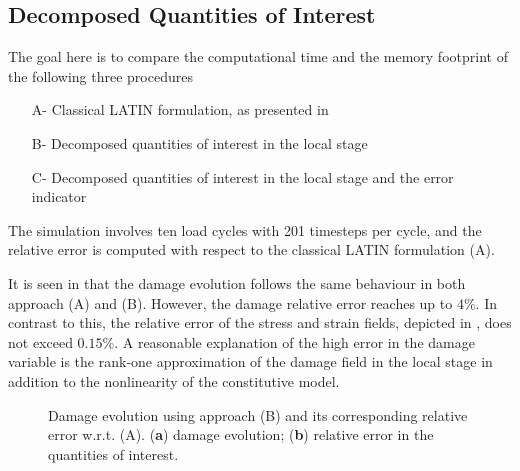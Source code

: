 \subsection{Decomposed Quantities of Interest}
\label{sec7_example_pgd}
The goal here is to compare the computational time and the memory footprint of the following three procedures
\begin{enumerate}
	\item[A-] Classical LATIN formulation, as presented in 
	\item[B-] Decomposed quantities of interest in the local stage
	\item[C-] Decomposed quantities of interest in the local stage and the error indicator
\end{enumerate}

The simulation involves ten load cycles with 201 timesteps per cycle, and the relative error is computed with respect to the classical LATIN formulation (A).

It is seen in  that the damage evolution follows the same behaviour in both approach (A) and (B). However, the damage relative error reaches up to $4\unit{\%}$. In contrast to this, the relative error of the stress and strain fields, depicted in , does not exceed $0.15\unit{\%}$. A reasonable explanation of the high error in the damage variable is the rank-one approximation of the damage field in the local stage in addition to the nonlinearity of the constitutive model.
\begin{figure}[hbt!]
	\centering
	\begin{subfigure}[t]{0.49\linewidth}
		
		\caption{}
		\label{fig_local_pgd1}
	\end{subfigure}
	\hfil
	\begin{subfigure}[t]{0.49\linewidth}
		
		\caption{}
		\label{fig_local_pgd2}
	\end{subfigure}
	\caption{Damage evolution using approach (B) and its corresponding relative error w.r.t. (A). (\textbf{a}) damage evolution; (\textbf{b}) relative error in the quantities of interest.}
	\label{fig_local_pgd}
\end{figure}

